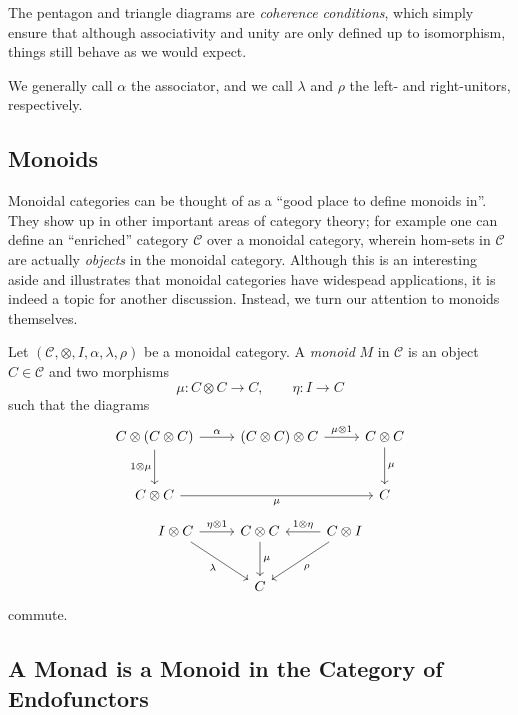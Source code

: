 The pentagon and triangle diagrams are \emph{coherence conditions}, which simply ensure that although associativity and unity are only defined up to isomorphism, things still behave as we would expect.

\begin{remark}
	We generally call $\alpha $ the associator, and we call $\lambda $ and $\rho $ the left- and right-unitors, respectively.
\end{remark}


\subsection{Monoids}

Monoidal categories can be thought of as a ``good place to define monoids in''.  They show up in other important areas of category theory; for example one can define an ``enriched'' category $\mathcal{C} $ over a monoidal category, wherein hom-sets in $\mathcal{C} $ are actually \emph{objects} in the monoidal category. Although this is an interesting aside and illustrates that monoidal categories have widespead applications, it is indeed a topic for another discussion. Instead, we turn our attention to monoids themselves.

\begin{definition}[Monoid]\label{dfn:12}
	Let $(\mathcal{C},\otimes ,I,\alpha ,\lambda ,\rho ) $ be a monoidal category. A \emph{monoid} $M$ in $\mathcal{C} $ is an object $C\in \mathcal{C} $ and two morphisms
	\[
		\mu : C\otimes C \to C,\qquad \eta : I \to C
	\]
	such that the diagrams
	\[\begin{tikzcd}[row sep = 2.5em, column sep = 2.5em]
	C\otimes (C\otimes C)\ar[" \alpha  ", r] \ar[" 1\otimes \mu  "', d]  & (C\otimes C)\otimes C\ar[" \mu \otimes 1 ", r]  & C\otimes C\ar[" \mu  ", d]  \\
	C\otimes C\ar[" \mu  "', rr]  &  & C
	\end{tikzcd}\]
	\[\begin{tikzcd}[row sep = 2.5em, column sep = 2.5em]
	I\otimes C\ar[" \eta \otimes 1 ", r] \ar[" \lambda  "', dr]  & C\otimes C\ar[" \mu  ", d]  & C\otimes I\ar[" 1\otimes \eta  "', l]\ar[" \rho  ", dl]   \\
	 & C & 
	\end{tikzcd}\]
	commute.
\end{definition}

\subsection{A Monad is a Monoid in the Category of Endofunctors}

